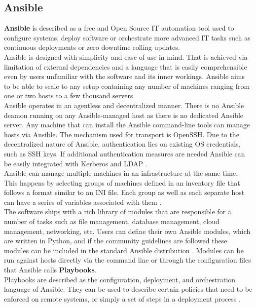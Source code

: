 \documentclass{article}
\begin{document}
\subsection{Ansible}
\textbf{Ansible} is described as a free and Open Source IT automation tool used to configure systems, deploy software or orchestrate more advanced IT tasks such as continuous deployments or zero downtime rolling updates\cite{ansible-docs}.\\
Ansible is designed with simplicity and ease of use in mind. That is achieved via limitation of external dependencies and a language that is easily comprehensible even by users unfamiliar with the software and its inner workings. Ansible aims to be able to scale to any setup containing any number of machines ranging from one or two hosts to a few thousand servers\cite{ansible-docs}. \\
Ansible operates in an agentless and decentralized  manner. There is no Ansible deamon running on any Ansible-managed host as there is no dedicated Ansible server. Any machine that can install the Ansible command-line tools can manage hosts via Ansible. The mechanism used for transport is OpenSSH. Due to the decentralized nature of Ansible, authentication lies on existing OS credentials, such as SSH keys. If additional authentication measures are needed Ansible can be easily integrated with Kerberos and LDAP \cite{ansible-docs}. \\
Ansible can manage multiple machines in an infrastructure at the same time. This happens by selecting groups of machines defined in an inventory file that follows a format similar to an INI file.
Each group as well as each separate host can have a series of variables associated with them \cite{ansible-inventory}.\\
The software ships with a rich library of modules that are responsible for a number of tasks such as file management, database management, cloud management, networking, etc. Users can define their own Ansible modules, which are written in Python, and if the community guidelines are followed these modules can be included in the standard Ansible distribution \cite{ansible-modules}.
Modules can be run against hosts directly via the command line or through the configuration files that Ansible calls \textbf{Playbooks}.\\
Playbooks are described as the configuration, deployment, and orchestration language of Ansible. They can be used to describe certain policies that need to be enforced on remote systems, or simply a set of steps in a deployment process \cite{ansible-playbooks}.\\
\end{document}
